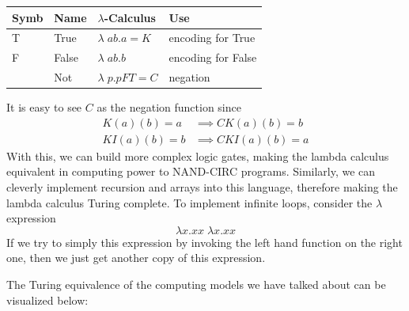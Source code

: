  \begin{center}
      \begin{tabular}{l|l|l|l}
          Symb & Name & $\lambda$-Calculus & Use\\
          \hline
          T & True & $\lambda\;ab.a = K$ & encoding for True \\
          F & False & $\lambda\;ab.b$ & encoding for False \\
           & Not & $\lambda\;p.pFT = C$ & negation
      \end{tabular}
  \end{center}
  It is easy to see $C$ as the negation function since 
  \begin{align*}
      K (a)(b) = a & \implies C K (a)(b) = b \\
      K I (a)(b) = b & \implies C K I (a)(b) = a
  \end{align*}
  With this, we can build more complex logic gates, making the lambda calculus equivalent in computing power to NAND-CIRC programs. Similarly, we can cleverly implement recursion and arrays into this language, therefore making the lambda calculus Turing complete. To implement infinite loops, consider the $\lambda$ expression
  \begin{equation}
    \lambda x. xx \; \lambda x. xx
  \end{equation}
  If we try to simply this expression by invoking the left hand function on the right one, then we just get another copy of this expression. 

  The Turing equivalence of the computing models we have talked about can be visualized below: 
  \begin{center}
  \end{center}

